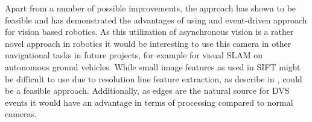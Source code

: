 Apart from a number of possible improvements, the approach has shown to be feasible and has demonstrated the advantages of using and event-driven approach for vision based robotics. As this utilization of asynchronous vision is a rather novel approach in robotics it would be interesting to use this camera in other navigational tasks in future projects, for example for visual SLAM on autonomous ground vehicles. While small image features as used in SIFT \cite{SIFT} might be difficult to use due to resolution line feature extraction, as describe in \cite{LineTracking}, could be a feasible approach. Additionally, as edges are the  natural source for DVS events it would have an advantage in terms of processing compared to normal cameras.
